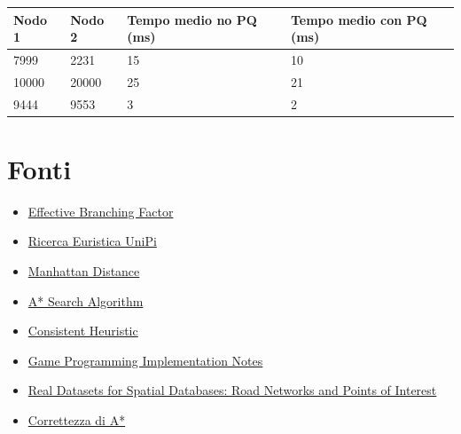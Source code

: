 \documentclass[12pt,a4paper]{report}
\begin{document}
\begin{table}[H]
	\centering
	\begin{tabular}{@{}llll@{}}
		\toprule
		\textbf{Nodo 1} & \textbf{Nodo 2} & \textbf{Tempo medio no PQ (ms)} & \textbf{Tempo medio con PQ (ms)}\\ \midrule
		7999 & 2231  & 15  & 10  \\
		10000 & 20000  & 25  & 21  \\
		9444 & 9553  & 3  & 2  \\ \bottomrule
	\end{tabular}
\end{table}


\chapter{Fonti}

\begin{itemize}
	\item \href{http://ozark.hendrix.edu/~ferrer/courses/335/f11/lectures/effective-branching.html}{Effective Branching Factor}
	\item \href{http://pages.di.unipi.it/micheli/DID/IIA-2016/part1/4e5-2016-infosearch-post-lez.pdf}{Ricerca Euristica UniPi}
	\item \href{https://www.geeksforgeeks.org/sum-manhattan-distances-pairs-points/}{Manhattan Distance}
	\item \href{https://en.wikipedia.org/wiki/A*_search_algorithm}{A* Search Algorithm}
	\item \href{https://en.wikipedia.org/wiki/Consistent_heuristic}{Consistent Heuristic}
	\item \href{http://theory.stanford.edu/~amitp/GameProgramming/ImplementationNotes.html}{Game Programming Implementation Notes}
	\item \href{https://www.cs.utah.edu/~lifeifei/SpatialDataset.htm}{Real Datasets for Spatial Databases: Road Networks and Points of Interest}
	\item \href{https://www.cs.ubc.ca/~kevinlb/teaching/cs322%20-%202008-9/Lectures/Search5.pdf}{Correttezza di A*}
\end{itemize}
\end{document}
